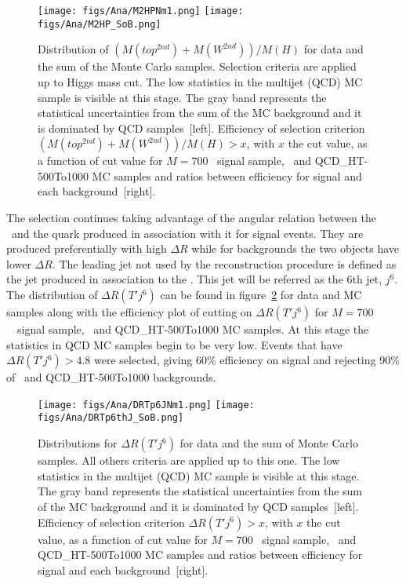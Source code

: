 \begin{figure}[!Hhtbp]
  \begin{center}
    \texttt{[image: figs/Ana/M2HPNm1.png]}
    \texttt{[image: figs/Ana/M2HP\_SoB.png]}
    \caption{Distribution of $(M(top^{2nd})+M(W^{2nd}))/M(H)$ for data and the sum of the Monte Carlo samples. Selection criteria are applied up to Higgs mass cut. The low statistics in the multijet (QCD) MC sample is visible at this stage. The gray band represents the statistical uncertainties from the sum of the MC background and it is dominated by QCD samples~[left]. Efficiency of selection criterion $(M(top^{2nd})+M(W^{2nd}))/M(H)>x$, with $x$ the cut value, as a function of cut value for $M=700$ \GeVcc~signal sample, \ttbar~and QCD\_HT-500To1000 MC samples and ratios between efficiency for signal and each background~[right].}
    \label{fig:m2thp}
  \end{center}
\end{figure}

The selection continues taking advantage of the angular relation between the \Tp~and the quark produced in association with it for signal events. They are produced preferentially with high $\Delta R$ while for backgrounds the two objects have lower $\Delta R$. The leading jet not used by the reconstruction procedure is defined as the jet produced in association to the \Tp. This jet will be referred as the 6th jet, $j^{6}$. The distribution of $\Delta R (T' j^{6})$ can be found in figure~\ref{fig:jet6} for data and MC samples along with the efficiency plot of cutting on $\Delta R (T' j^{6})$ for ${M=700}$~\GeVcc~signal sample, \ttbar~and QCD\_HT-500To1000 MC samples. At this stage the statistics in QCD MC samples begin to be very low. Events that have $\Delta R (T' j^{6})>4.8$ were selected, giving 60\% efficiency on signal and rejecting 90\% of \ttbar~and QCD\_HT-500To1000 backgrounds.

\begin{figure}[!Hhtbp]
  \begin{center}
    \texttt{[image: figs/Ana/DRTp6JNm1.png]}
    \texttt{[image: figs/Ana/DRTp6thJ\_SoB.png]}
    \caption{Distributions for $\Delta R (T' j^{6})$  for data and the sum of Monte Carlo samples. All others criteria are applied up to this one. The low statistics in the multijet (QCD) MC sample is visible at this stage. The gray band represents the statistical uncertainties from the sum of the MC background and it is dominated by QCD samples~[left]. Efficiency of selection criterion $\Delta R (T' j^{6})>x$, with $x$ the cut value, as a function of cut value for $M=700$ \GeVcc~signal sample, \ttbar~and QCD\_HT-500To1000 MC samples and ratios between efficiency for signal and each background~[right].}
    \label{fig:jet6}
  \end{center}
\end{figure}


